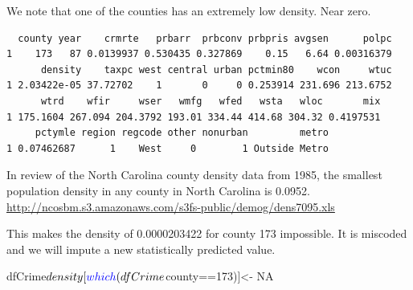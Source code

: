 \documentclass[]{article}
\newenvironment{Shaded}{}{}
\newcommand{\DecValTok}[1]{#1}
\newcommand{\FloatTok}[1]{#1}
\newcommand{\KeywordTok}[1]{\textcolor[rgb]{0.00,0.00,1.00}{#1}}
\newcommand{\NormalTok}[1]{#1}
\newcommand{\OperatorTok}[1]{#1}
\newcommand{\OtherTok}[1]{\textcolor[rgb]{1.00,0.25,0.00}{#1}}
\newcommand{\StringTok}[1]{\textcolor[rgb]{0.00,0.50,0.50}{#1}}
\begin{document}
We note that one of the counties has an extremely low density. Near
zero.

\begin{Shaded}
\end{Shaded}

\begin{verbatim}
  county year    crmrte   prbarr  prbconv prbpris avgsen      polpc
1    173   87 0.0139937 0.530435 0.327869    0.15   6.64 0.00316379
      density    taxpc west central urban pctmin80    wcon     wtuc
1 2.03422e-05 37.72702    1       0     0 0.253914 231.696 213.6752
      wtrd    wfir     wser   wmfg   wfed   wsta   wloc       mix
1 175.1604 267.094 204.3792 193.01 334.44 414.68 304.32 0.4197531
     pctymle region regcode other nonurban         metro
1 0.07462687      1    West     0        1 Outside Metro
\end{verbatim}

In review of the North Carolina county density data from 1985, the
smallest population density in any county in North Carolina is 0.0952.
\url{http://ncosbm.s3.amazonaws.com/s3fs-public/demog/dens7095.xls}

This makes the density of 0.0000203422 for county 173 impossible. It is
miscoded and we will impute a new statistically predicted value.

\begin{Shaded}
\begin{Highlighting}[]
\NormalTok{dfCrime}\OperatorTok{$}\NormalTok{density[}\KeywordTok{which}\NormalTok{(dfCrime}\OperatorTok{$}\NormalTok{county}\OperatorTok{==}\DecValTok{173}\NormalTok{)]<-}\StringTok{ }\OtherTok{NA}
\end{Highlighting}
\end{Shaded}
\end{document}
